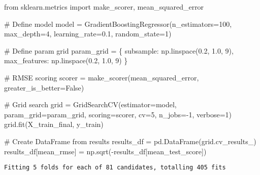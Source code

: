 \documentclass[
  letterpaper,
  DIV=11,
  numbers=noendperiod]{scrreprt}
\newenvironment{Shaded}{\begin{snugshade}}{\end{snugshade}}
\newcommand{\CommentTok}[1]{\textcolor[rgb]{0.37,0.37,0.37}{#1}}
\newcommand{\DecValTok}[1]{\textcolor[rgb]{0.68,0.00,0.00}{#1}}
\newcommand{\FloatTok}[1]{\textcolor[rgb]{0.68,0.00,0.00}{#1}}
\newcommand{\ImportTok}[1]{\textcolor[rgb]{0.00,0.46,0.62}{#1}}
\newcommand{\NormalTok}[1]{\textcolor[rgb]{0.00,0.23,0.31}{#1}}
\newcommand{\OperatorTok}[1]{\textcolor[rgb]{0.37,0.37,0.37}{#1}}
\newcommand{\StringTok}[1]{\textcolor[rgb]{0.13,0.47,0.30}{#1}}
\newcommand{\VariableTok}[1]{\textcolor[rgb]{0.07,0.07,0.07}{#1}}
\begin{document}
\begin{Shaded}
\begin{Highlighting}[]
\ImportTok{from}\NormalTok{ sklearn.metrics }\ImportTok{import}\NormalTok{ make\_scorer, mean\_squared\_error}

\CommentTok{\# Define model}
\NormalTok{model }\OperatorTok{=}\NormalTok{ GradientBoostingRegressor(n\_estimators}\OperatorTok{=}\DecValTok{100}\NormalTok{, max\_depth}\OperatorTok{=}\DecValTok{4}\NormalTok{, learning\_rate}\OperatorTok{=}\FloatTok{0.1}\NormalTok{, random\_state}\OperatorTok{=}\DecValTok{1}\NormalTok{)}

\CommentTok{\# Define param grid}
\NormalTok{param\_grid }\OperatorTok{=}\NormalTok{ \{}
    \StringTok{\textquotesingle{}subsample\textquotesingle{}}\NormalTok{: np.linspace(}\FloatTok{0.2}\NormalTok{, }\FloatTok{1.0}\NormalTok{, }\DecValTok{9}\NormalTok{),}
    \StringTok{\textquotesingle{}max\_features\textquotesingle{}}\NormalTok{: np.linspace(}\FloatTok{0.2}\NormalTok{, }\FloatTok{1.0}\NormalTok{, }\DecValTok{9}\NormalTok{)}
\NormalTok{\}}

\CommentTok{\# RMSE scoring}
\NormalTok{scorer }\OperatorTok{=}\NormalTok{ make\_scorer(mean\_squared\_error, greater\_is\_better}\OperatorTok{=}\VariableTok{False}\NormalTok{)}

\CommentTok{\# Grid search}
\NormalTok{grid }\OperatorTok{=}\NormalTok{ GridSearchCV(estimator}\OperatorTok{=}\NormalTok{model, param\_grid}\OperatorTok{=}\NormalTok{param\_grid,}
\NormalTok{                    scoring}\OperatorTok{=}\NormalTok{scorer, cv}\OperatorTok{=}\DecValTok{5}\NormalTok{, n\_jobs}\OperatorTok{={-}}\DecValTok{1}\NormalTok{, verbose}\OperatorTok{=}\DecValTok{1}\NormalTok{)}
\NormalTok{grid.fit(X\_train\_final, y\_train)}

\CommentTok{\# Create DataFrame from results}
\NormalTok{results\_df }\OperatorTok{=}\NormalTok{ pd.DataFrame(grid.cv\_results\_)}
\NormalTok{results\_df[}\StringTok{\textquotesingle{}mean\_rmse\textquotesingle{}}\NormalTok{] }\OperatorTok{=}\NormalTok{ np.sqrt(}\OperatorTok{{-}}\NormalTok{results\_df[}\StringTok{\textquotesingle{}mean\_test\_score\textquotesingle{}}\NormalTok{])}
\end{Highlighting}
\end{Shaded}

\begin{verbatim}
Fitting 5 folds for each of 81 candidates, totalling 405 fits
\end{verbatim}
\end{document}
